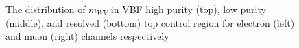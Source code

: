 \begin{figure}[ht]
	\caption{The distribution of $m_{WV}$ in VBF high purity (top), low purity (middle), and resolved (bottom) top control region for electron (left) and muon (right) channels respectively}
	\label{Fig:mWVVBFTR}
\end{figure}
\clearpage

